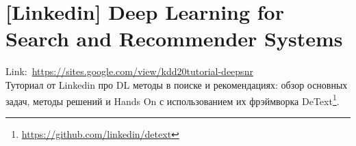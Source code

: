 


\section*{[Linkedin] Deep Learning for Search and Recommender Systems} 

Link:~\url{https://sites.google.com/view/kdd20tutorial-deepsnr} \\

Туториал от Linkedin про DL методы в поиске и рекомендациях: обзор основных задач, методы решений и Hands On с использованием их фрэймворка DeText\footnote{\url{https://github.com/linkedin/detext}}.

